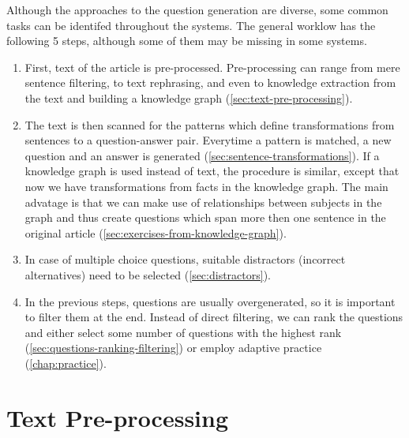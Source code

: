 \documentclass[a4paper, 12pt, twoside]{fithesis2}		%
\renewcommand{\_}{\leavevmode \kern0.07em\vbox{\hrule width0.4em}}
\newenvironment{myEnumerate}{
  \begin{enumerate}[leftmargin=2em,rightmargin=1em,itemsep=\parskip ,parsep=0em,topsep=0em,partopsep=0em]
}{
  \end{enumerate}
}
\newcounter{choice}
\begin{document}
Although the approaches to the question generation are diverse,
some common tasks can be identifed throughout the systems.
The general worklow has the following 5 steps, although some of them may be missing in some systems.
\begin{myEnumerate}
\item First, text of the article is pre-processed.
Pre-processing can range from mere sentence filtering,
to text rephrasing, and even to knowledge extraction from the text and building a knowledge graph
(\autoref{sec:text-pre-processing}).

\item The text is then scanned for the patterns which define transformations from sentences to a question-answer pair.
  Everytime a pattern is matched, a new question and an answer is generated
  (\autoref{sec:sentence-transformations}).
  If a knowledge graph is used instead of text, the procedure is similar, except that now we have transformations from facts in the knowledge graph. The main advatage is that we can make use of relationships between subjects in the graph and thus create questions which span more then one sentence in the original article
  (\autoref{sec:exercises-from-knowledge-graph}).

\item In case of multiple choice questions, suitable distractors (incorrect alternatives) need to be selected
(\autoref{sec:distractors}).

\item In the previous steps, questions are usually overgenerated, so it is important to filter them at the end. Instead of direct filtering, we can rank the questions and either select some number of questions with the highest rank
  (\autoref{sec:questions-ranking-filtering}) or employ adaptive practice (\autoref{chap:practice}).
\end{myEnumerate}

\section{Text Pre-processing}
\label{sec:text-pre-processing}
\end{document}

